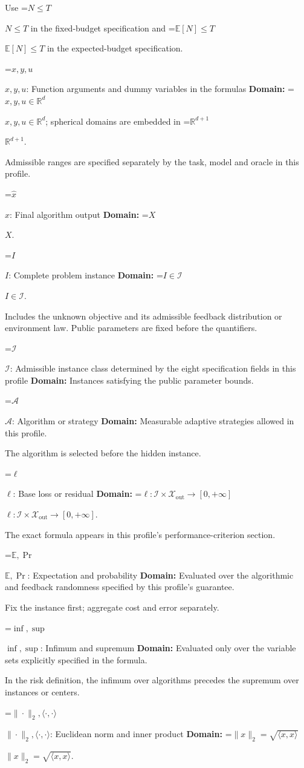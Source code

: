 \documentclass[10pt,a4paper]{article}
\newcommand{\AtlasMath}[1]{\par\begingroup\centering\setbox0=\hbox{$\displaystyle #1$}\ifdim\wd0>1.4\linewidth\typeout{ATLAS WIDE FORMULA: \the\wd0}\fi\ifdim\wd0>\linewidth\resizebox{\linewidth}{!}{\box0}\else\box0\fi\par\endgroup}
\newcommand{\AtlasInlineMath}[1]{\begingroup\setbox0=\hbox{$#1$}\ifdim\wd0>.4\linewidth\endgroup\AtlasMath{#1}\else\endgroup$#1$\fi}
\begin{document}
Use \AtlasInlineMath{N\le T} in the fixed-budget specification and \AtlasInlineMath{\mathbb{E}[N]\le T} in the expected-budget specification.

\AtlasInlineMath{x,y,u}: Function arguments and dummy variables in the formulas \textbf{Domain:} \AtlasInlineMath{x,y,u\in\mathbb{R}^d}; spherical domains are embedded in \AtlasInlineMath{\mathbb{R}^{d+1}}.

Admissible ranges are specified separately by the task, model and oracle in this profile.

\AtlasInlineMath{\widehat{x}}: Final algorithm output \textbf{Domain:} \AtlasInlineMath{X}.

\AtlasInlineMath{I}: Complete problem instance \textbf{Domain:} \AtlasInlineMath{I\in\mathcal{I}}.

Includes the unknown objective and its admissible feedback distribution or environment law. Public parameters are fixed before the quantifiers.

\AtlasInlineMath{\mathcal{I}}: Admissible instance class determined by the eight specification fields in this profile \textbf{Domain:} Instances satisfying the public parameter bounds.

\AtlasInlineMath{\mathcal{A}}: Algorithm or strategy \textbf{Domain:} Measurable adaptive strategies allowed in this profile.

The algorithm is selected before the hidden instance.

\AtlasInlineMath{\ell}: Base loss or residual \textbf{Domain:} \AtlasInlineMath{\ell:\mathcal{I}\times\mathcal{X}_{\mathrm{out}}\to[0,+\infty]}.

The exact formula appears in this profile's performance-criterion section.

\AtlasInlineMath{\mathbb{E},\Pr}: Expectation and probability \textbf{Domain:} Evaluated over the algorithmic and feedback randomness specified by this profile's guarantee.

Fix the instance first; aggregate cost and error separately.

\AtlasInlineMath{\inf,\sup}: Infimum and supremum \textbf{Domain:} Evaluated only over the variable sets explicitly specified in the formula.

In the risk definition, the infimum over algorithms precedes the supremum over instances or centers.

\AtlasInlineMath{\|\cdot\|_2,\langle\cdot,\cdot\rangle}: Euclidean norm and inner product \textbf{Domain:} \AtlasInlineMath{\|x\|_2=\sqrt{\langle x,x\rangle}}.
\end{document}

